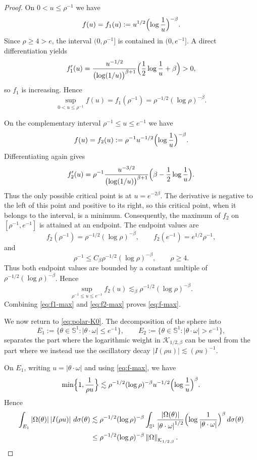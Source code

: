 \documentclass[11pt]{amsart}
\theoremstyle{remark}
\numberwithin{equation}{section}
\newcommand{\Sph}{\mathbb S^1}
\newcommand{\cK}{\mathcal K}
\newcommand{\norm}[1]{\left\lVert #1\right\rVert}
\newcommand{\abs}[1]{\left\lvert #1\right\rvert}
\begin{document}
\begin{proof}
		On \(0<u\le\rho^{-1}\) we have
		\[
		f(u)=f_1(u):=u^{1/2}\Bigl(\log\frac1u\Bigr)^{-\beta}.
		\]
		Since \(\rho\ge4>e\), the interval \((0,\rho^{-1}]\) is contained in \((0,e^{-1}]\). A direct differentiation yields
		\[
		f_1'(u)
		=
		\frac{u^{-1/2}}{\bigl(\log(1/u)\bigr)^{\beta+1}}
		\Bigl(\frac12\log\frac1u+\beta\Bigr)>0,
		\]
		so \(f_1\) is increasing. Hence
		\begin{equation}\label{eq:f1-max}
			\sup_{0<u\le\rho^{-1}}f(u)=f_1(\rho^{-1})=\rho^{-1/2}(\log\rho)^{-\beta}.
		\end{equation}
		
		On the complementary interval \(\rho^{-1}\le u\le e^{-1}\) we have
		\[
		f(u)=f_2(u):=\rho^{-1}u^{-1/2}\Bigl(\log\frac1u\Bigr)^{-\beta}.
		\]
		Differentiating again gives
		\[
		f_2'(u)
		=
		\rho^{-1}
		\frac{u^{-3/2}}{\bigl(\log(1/u)\bigr)^{\beta+1}}
		\Bigl(\beta-\frac12\log\frac1u\Bigr).
		\]
		Thus the only possible critical point is at \(u=e^{-2\beta}\).  The derivative
		is negative to the left of this point and positive to its right, so this
		critical point, when it belongs to the interval, is a minimum.  Consequently,
		the maximum of \(f_2\) on \([\rho^{-1},e^{-1}]\) is attained at an endpoint.
		The endpoint values are
		\[
		f_2(\rho^{-1})=\rho^{-1/2}(\log\rho)^{-\beta},
		\qquad
		f_2(e^{-1})=e^{1/2}\rho^{-1},
		\]
		and
		\[
		\rho^{-1}
		\le C_\beta\rho^{-1/2}(\log\rho)^{-\beta},
		\qquad \rho\ge4.
		\]
		Thus both endpoint values are bounded by a constant multiple of
		\(\rho^{-1/2}(\log\rho)^{-\beta}\). Hence
		\begin{equation}\label{eq:f2-max}
			\sup_{\rho^{-1}\le u\le e^{-1}}f_2(u)
			\lesssim_\beta
			\rho^{-1/2}(\log\rho)^{-\beta}.
		\end{equation}
		Combining \eqref{eq:f1-max} and \eqref{eq:f2-max} proves \eqref{eq:f-max}.
		
		We now return to \eqref{eq:polar-K0}. The decomposition of the sphere into
		\[
		E_1:=\{\theta\in\Sph: \abs{\theta\cdot\omega}\le e^{-1}\},
		\qquad
		E_2:=\{\theta\in\Sph: \abs{\theta\cdot\omega}> e^{-1}\},
		\]
		separates the part where the logarithmic weight in \(\cK_{1/2,\beta}\) can be
		used from the part where we instead use the oscillatory decay
		\(\abs{I(\rho u)}\lesssim(\rho u)^{-1}\).
		
		On \(E_1\), writing \(u=\abs{\theta\cdot\omega}\) and using \eqref{eq:f-max}, we have
		\[
		\min\Bigl\{1,\frac1{\rho u}\Bigr\}
		\lesssim
		\rho^{-1/2}(\log\rho)^{-\beta}
		u^{-1/2}\Bigl(\log\frac1u\Bigr)^\beta.
		\]
		Hence
		\begin{align*}
			\int_{E_1}\abs{\Omega(\theta)}\abs{I(\rho u)}\,d\sigma(\theta)
			&\lesssim
			\rho^{-1/2}(\log\rho)^{-\beta}
			\int_{\Sph}
			\frac{\abs{\Omega(\theta)}}{\abs{\theta\cdot\omega}^{1/2}}
			\Bigl(\log\frac1{\abs{\theta\cdot\omega}}\Bigr)^\beta\,d\sigma(\theta)
			\\
			&\le
			\rho^{-1/2}(\log\rho)^{-\beta}\norm{\Omega}_{\cK_{1/2,\beta}}.
		\end{align*}
		

\end{proof}
\end{document}
